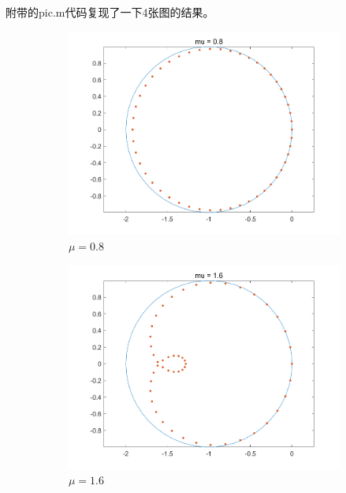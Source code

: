 \documentclass[twoside,a4paper]{article}
\begin{document}
附带的pic.m代码复现了一下4张图的结果。
\begin{figure}[htbp]
  \centering
  \begin{subfigure}[b]{0.45\textwidth}
      \includegraphics[width=\textwidth]{mu_0.8.png}
      \caption{$\mu=0.8$}
  \end{subfigure}
  \begin{subfigure}[b]{0.45\textwidth}
      \includegraphics[width=\textwidth]{mu_1.6.png}
      \caption{$\mu=1.6$}
  \end{subfigure}
  \\
  \begin{subfigure}[b]{0.45\textwidth}

\end{subfigure}
\end{figure}
\end{document}
